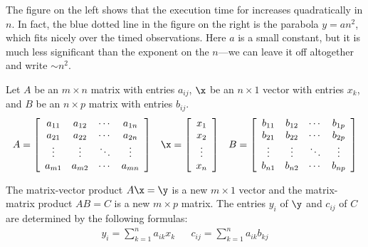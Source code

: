 The figure on the left shows that the execution time for  increases quadratically in $n$.
In fact, the blue dotted line in the figure on the right is the parabola $y = an^2$, which fits nicely over the timed observations. Here $a$ is a small constant, but it is much less significant than the exponent on the $n$---we can leave it off altogether and write  $\sim n^2$.%


\begin{problem} %
Let $A$ be an $m \times n$ matrix with entries $a_{ij}$, $\x$ be an $n \times 1$ vector with entries $x_k$, and $B$ be an $n \times p$ matrix with entries $b_{ij}$.
%
\begin{align*}
A = \left[\begin{array}{cccc}
a_{11} & a_{12} & \cdots & a_{1n} \\
a_{21} & a_{22} & \cdots & a_{2n} \\
\vdots & \vdots & \ddots & \vdots \\
a_{m1} & a_{m2} & \cdots & a_{mn}
\end{array}\right]
&&
\x = \left[\begin{array}{c}
x_1 \\ x_2 \\ \vdots \\ x_n
\end{array}\right]
&&
B = \left[\begin{array}{cccc}
b_{11} & b_{12} & \cdots & b_{1p} \\
b_{21} & b_{22} & \cdots & b_{2p} \\
\vdots & \vdots & \ddots & \vdots \\
b_{n1} & b_{n2} & \cdots & b_{np}
\end{array}\right]
\end{align*}

The matrix-vector product $A\x = \y$ is a new $m \times 1$ vector and the matrix-matrix product $AB = C$ is a new $m \times p$ matrix.
The entries $y_i$ of $\y$ and $c_{ij}$ of $C$ are determined by the following formulas:
%
\begin{align*}
y_i = \sum_{k=1}^n a_{ik}x_k%
&&
c_{ij} = \sum_{k=1}^n a_{ik}b_{kj}%
\end{align*}


\end{problem}
